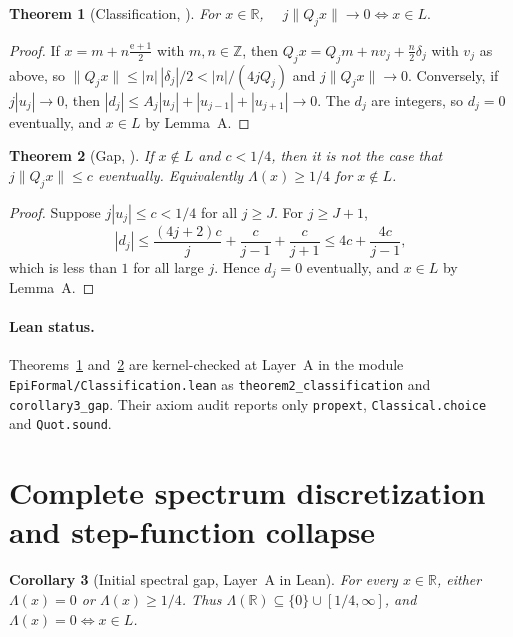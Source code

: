 \documentclass[11pt]{article}
\newtheorem{theorem}{Theorem}
\newtheorem{corollary}[theorem]{Corollary}
\theoremstyle{definition}
\theoremstyle{remark}
\newcommand{\R}{\mathbb{R}}
\newcommand{\Z}{\mathbb{Z}}
\newcommand{\ee}{\mathrm{e}}
\newcommand{\Lam}{\Lambda}
\begin{document}
\begin{theorem}[Classification, {\cite[Thm.~2]{Phase1}}]\label{thm:class}
For $x\in\R$, $\quad j\|Q_jx\|\to0\iff x\in L.$
\end{theorem}

\begin{proof}
If $x=m+n\frac{\ee+1}{2}$ with $m,n\in\Z$, then
$Q_jx=Q_jm+nv_j+\tfrac n2\delta_j$ with $v_j$ as above, so
$\|Q_jx\|\le|n|\,|\delta_j|/2<|n|/(4jQ_j)$ and $j\|Q_jx\|\to0$.
Conversely, if $j|u_j|\to0$, then
$|d_j|\le A_j|u_j|+|u_{j-1}|+|u_{j+1}|\to0$. The $d_j$ are integers, so
$d_j=0$ eventually, and $x\in L$ by Lemma~A.
\end{proof}

\begin{theorem}[Gap, {\cite[Cor.~3]{Phase1}}]\label{thm:gap}
If $x\notin L$ and $c<1/4$, then it is \emph{not} the case that
$j\|Q_jx\|\le c$ eventually. Equivalently $\Lam(x)\ge1/4$ for $x\notin L$.
\end{theorem}

\begin{proof}
Suppose $j|u_j|\le c<1/4$ for all $j\ge J$. For $j\ge J+1$,
\[
 |d_j|\le\frac{(4j+2)c}{j}+\frac{c}{j-1}+\frac{c}{j+1}
 \le4c+\frac{4c}{j-1},
\]
which is less than $1$ for all large $j$. Hence $d_j=0$ eventually, and
$x\in L$ by Lemma~A.
\end{proof}

\paragraph{Lean status.} Theorems~\ref{thm:class} and~\ref{thm:gap} are
kernel-checked at Layer~A in the module
\texttt{EpiFormal/\allowbreak Classification.lean} as
\texttt{theorem2\_\allowbreak classification} and
\texttt{corollary3\_\allowbreak gap}. Their axiom audit reports
only \texttt{propext}, \texttt{Classical.choice} and \texttt{Quot.sound}.

\section{Complete spectrum discretization and step-function collapse}\label{sec:spectrum}

\begin{corollary}[Initial spectral gap, Layer~A in Lean]\label{thm:spectral}
For every $x\in\R$, either $\Lam(x)=0$ or $\Lam(x)\ge1/4$. Thus
$\Lam(\R)\subseteq\{0\}\cup[1/4,\infty]$, and $\Lam(x)=0\iff x\in L$.
\end{corollary}
\end{document}
